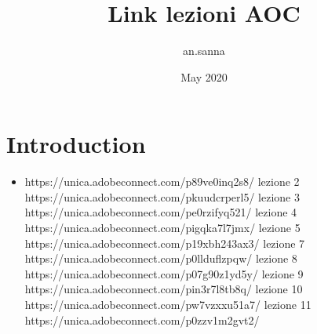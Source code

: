 \documentclass{article}
\title{Link lezioni AOC}
\author{an.sanna }
\date{May 2020}
\begin{document}
\maketitle

\section{Introduction}
\begin{itemize}
lezione 1 \item https://unica.adobeconnect.com/p89ve0inq2s8/
lezione 2 https://unica.adobeconnect.com/pkuudcrperl5/
lezione 3 https://unica.adobeconnect.com/pe0rzifyq521/
lezione 4 https://unica.adobeconnect.com/pigqka7l7jmx/
lezione 5 https://unica.adobeconnect.com/p19xbh243ax3/
lezione 7 https://unica.adobeconnect.com/p0llduflzpqw/
lezione 8 https://unica.adobeconnect.com/p07g90z1yd5y/
lezione 9 https://unica.adobeconnect.com/pin3r7l8tb8q/
lezione 10 https://unica.adobeconnect.com/pw7vzxxu51a7/
lezione 11 https://unica.adobeconnect.com/p0zzv1m2gvt2/
\end{itemize}
\end{document}
